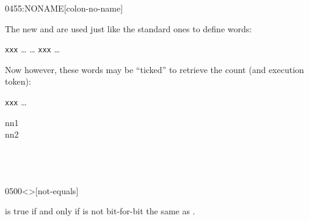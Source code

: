 \begin{worddef}{0455}{:NONAME}[colon-no-name]
\begin{rationale}
		The new \word{:} and \word{;} are used just like the standard
		ones to define words:

		\tab {\ldots} \word{:} \texttt{xxx} {\ldots} \word{;}
			{\ldots} \texttt{xxx} {\ldots}

		Now however, these words may be ``ticked'' to retrieve the
		count (and execution token):

		\tab {\ldots}  \texttt{xxx}   {\ldots}
	\end{rationale}

	\begin{testing}
	 nn1 \\
	 nn2 \\
	 \\
	 \\
	 \\
	\end{testing}
\end{worddef}


\begin{worddef}[ne]{0500}{<>}[not-equals]
\item {}

	 is true if and only if  is not bit-for-bit
	the same as .
\end{worddef}


